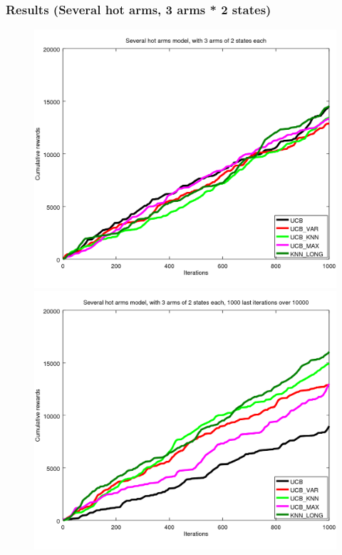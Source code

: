 \documentclass[french]{beamer}
\begin{document}
\begin{frame}
	\frametitle{Results (Several hot arms, 3 arms * 2 states)}
	
	\begin{figure}[h]
		\begin{minipage}[b]{.49\linewidth}
			\includegraphics[width=1.0\textwidth]{begin_m_1000it.png}
			
		\end{minipage}
		\hfill
		\begin{minipage}[b]{0.49\linewidth}
			\includegraphics[width=1.0\textwidth]{last_m_1000it.png}
			
		\end{minipage}
		\label{fig:f}
	\end{figure}
\end{frame}
\end{document}
